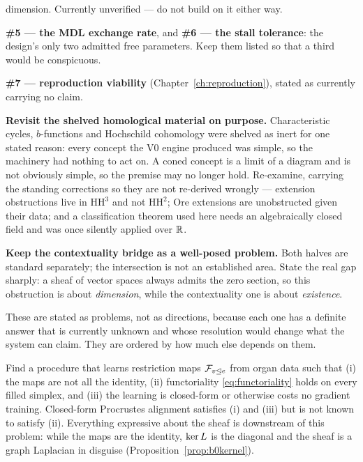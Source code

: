 \begin{workplan}{\Recast}
{    dimension. Currently unverified --- do not build on it either way.
  \item \textbf{\#5 --- the MDL exchange rate}, and \textbf{\#6 --- the stall
    tolerance}: the design's only two admitted free parameters. Keep them
    listed so that a third would be conspicuous.
  \item \textbf{\#7 --- reproduction viability}
    (Chapter~\ref{ch:reproduction}), stated as currently carrying no claim.
  \item \textbf{Revisit the shelved homological material on purpose.}
    Characteristic cycles, $b$-functions and Hochschild cohomology were shelved
    as inert for one stated reason: every concept the V0 engine produced was
    simple, so the machinery had nothing to act on. A coned concept is a limit
    of a diagram and is not obviously simple, so the premise may no longer
    hold. Re-examine, carrying the standing corrections so they are not
    re-derived wrongly --- extension obstructions live in $\mathrm{HH}^3$ and
    not $\mathrm{HH}^2$; Ore extensions are unobstructed given their data; and
    a classification theorem used here needs an algebraically closed field and
    was once silently applied over $\mathbb{R}$.
  \item \textbf{Keep the contextuality bridge as a well-posed problem.} Both
    halves are standard separately; the intersection is not an established
    area. State the real gap sharply: a sheaf of vector spaces always admits
    the zero section, so this obstruction is about \emph{dimension}, while the
    contextuality one is about \emph{existence}.
}

\end{workplan}

These are stated as problems, not as directions, because each one has a
definite answer that is currently unknown and whose resolution would
change what the system can claim. They are ordered by how much else
depends on them.

\begin{openproblem}\label{op:restrictions}
Find a procedure that learns restriction maps
$\mathcal{F}_{v\trianglelefteq e}$ from organ data such that
(i) the maps are not all the identity,
(ii) functoriality \eqref{eq:functoriality} holds on every filled
simplex, and
(iii) the learning is closed-form or otherwise costs no gradient
training.
Closed-form Procrustes alignment satisfies (i) and (iii) but is not known
to satisfy (ii). Everything expressive about the sheaf is downstream of
this problem: while the maps are the identity, $\ker L$ is the
diagonal and the sheaf is a graph Laplacian in disguise
(Proposition~\ref{prop:b0kernel}).
\end{openproblem}

